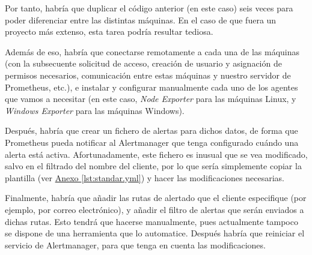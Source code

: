 Por tanto, habría que duplicar el código anterior (en este caso) seis veces para poder diferenciar entre las distintas máquinas. En el caso de que fuera un proyecto más extenso, esta tarea podría resultar tediosa.

Además de eso, habría que conectarse remotamente a cada una de las máquinas (con la subsecuente solicitud de acceso, creación de usuario y asignación de permisos necesarios, comunicación entre estas máquinas y nuestro servidor de Prometheus, etc.), e instalar y configurar manualmente cada uno de los agentes que vamos a necesitar (en este caso, \textit{Node Exporter} para las máquinas Linux, y \textit{Windows Exporter} para las máquinas Windows).

Después, habría que crear un fichero de alertas para dichos datos, de forma que Prometheus pueda notificar al Alertmanager que tenga configurado cuándo una alerta está activa. Afortunadamente, este fichero es inusual que se vea modificado, salvo en el filtrado del nombre del cliente, por lo que sería simplemente copiar la plantilla (ver \hyperref[lst:standar.yml]{Anexo \ref{lst:standar.yml}}) y hacer las modificaciones necesarias.

Finalmente, habría que añadir las rutas de alertado que el cliente especifique (por ejemplo, por correo electrónico), y añadir el filtro de alertas que serán enviados a dichas rutas. Esto tendrá que hacerse manualmente, pues actualmente tampoco se dispone de una herramienta que lo automatice. Después habría que reiniciar el servicio de Alertmanager, para que tenga en cuenta las modificaciones.